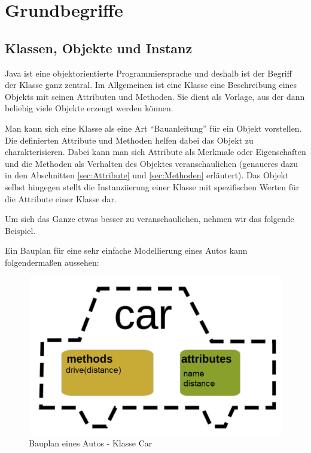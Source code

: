 \documentclass{tuda-pub}
\begin{document}
  \tableofcontents


  \chapter{Grundbegriffe}


  \section{Klassen, Objekte und Instanz}
  \label{sec:Klassen_Objekte_Instanz}
  Java ist eine objektorientierte Programmiersprache und deshalb ist der Begriff der Klasse ganz
  zentral. Im Allgemeinen ist eine Klasse eine Beschreibung eines Objekts mit seinen Attributen
  und Methoden. Sie dient als Vorlage, aus der dann beliebig viele Objekte erzeugt werden können.

  \br

  Man kann sich eine Klasse als eine Art \enquote{Bauanleitung} für ein Objekt vorstellen. Die
  definierten Attribute und Methoden helfen dabei das Objekt zu charakterisieren. Dabei kann man
  sich Attribute als Merkmale oder Eigenschaften und die Methoden als Verhalten des Objektes
  veranschaulichen (genaueres dazu in den Abschnitten \ref{sec:Attribute} und \ref{sec:Methoden}
  erläutert). Das Objekt selbst hingegen stellt die Instanziierung einer Klasse mit spezifischen
  Werten für die Attribute einer Klasse dar.

  \br

  Um sich das Ganze etwas besser zu veranschaulichen, nehmen wir das folgende Beispiel.

  \br

  Ein Bauplan für eine sehr einfache Modellierung eines Autos kann folgendermaßen aussehen:

  \begin{figure}[h]
    \centering
    \includegraphics[width=.45\linewidth]{Car.png}
    \caption{Bauplan eines Autos -  Klasse Car}
    \label{fig:Car}
  \end{figure}
\end{document}
